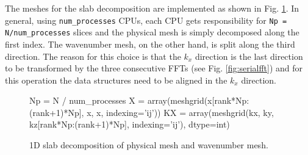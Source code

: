 \documentclass[11pt, oneside]{article}
\newcommand{\inpyth}{\lstinline[style=pythonstyle, basicstyle=\ttfamily]} %[]%
\begin{document}
The meshes for the slab decomposition are implemented as shown in Fig. \ref{fig:1Dslabmesh}. In general, using \inpyth{num_processes} CPUs, each CPU gets responsibility for \inpyth{Np = N/num_processes} slices and the physical mesh is simply decomposed along the first index. The wavenumber mesh, on the other hand, is split along the third direction. The reason for this choice is that the $k_x$ direction is the last direction to be transformed by the three consecutive FFTs (see Fig. \ref{fig:serialfft}) and for this operation the data structures need to be aligned in the $k_x$ direction.
\begin{figure}
\begin{python}
Np = N / num_processes
X = array(meshgrid(x[rank*Np:(rank+1)*Np], x, x, indexing='ij'))
KX = array(meshgrid(kx, ky, kz[rank*Np:(rank+1)*Np], indexing='ij'), dtype=int)
\end{python}
\caption{1D slab decomposition of physical mesh and wavenumber mesh.}
\label{fig:1Dslabmesh}
\end{figure}
\end{document}

